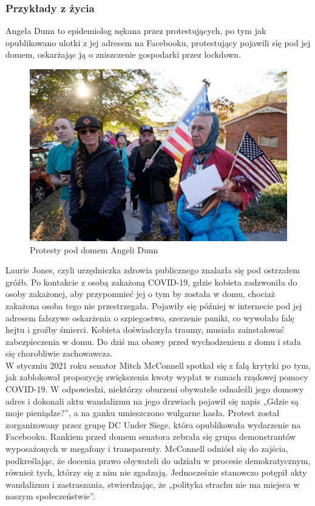 \subsubsection{Przykłady z życia}
Angela Dunn to epidemiolog nękana przez protestujących, po tym jak opublikowano ulotki z jej adresem na Facebooku, protestujący pojawili się pod jej domem, oskarżając ją o zniszczenie gospodarki przez lockdown. 

\begin{figure}
  \centering
  \includegraphics[width=1\textwidth]{images/lockdown.jpg}
  \caption{Protesty pod domem Angeli Dunn}
  \label{fig:lockdown}
\end{figure} 

Laurie Jones, czyli  urzędniczka zdrowia publicznego znalazła się pod ostrzałem gróźb. Po kontakcie z osobą zakażoną COVID-19, gdzie kobieta zadzwoniła do osoby zakażonej, aby przypomnieć jej o tym by została w domu, chociaż zakażona osoba tego nie przestrzegała. Pojawiły się później w internecie pod jej adresem fałszywe oskarżenia o szpiegostwo, szerzenie paniki, co wywołało falę hejtu i groźby śmierci.
Kobieta doświadczyła traumy, musiała zainstalować zabezpieczenia w domu. Do dziś ma obawy przed wychodzeniem z domu i stała się chorobliwie zachowawcza.\\

W styczniu 2021 roku senator Mitch McConnell spotkał się z falą krytyki po tym, jak zablokował propozycję zwiększenia kwoty wypłat w ramach rządowej pomocy COVID-19. W odpowiedzi, niektórzy oburzeni obywatele odnaleźli jego domowy adres i dokonali aktu wandalizmu na jego drzwiach pojawił się napis „Gdzie są moje pieniądze?”, a na ganku umieszczono wulgarne hasła.
Protest został zorganizowany przez grupę DC Under Siege, która opublikowała wydarzenie na Facebooku. Rankiem przed domem senatora zebrała się grupa demonstrantów wyposażonych w megafony i transparenty.
McConnell odniósł się do zajścia, podkreślając, że docenia prawo obywateli do udziału w procesie demokratycznym, również tych, którzy się z nim nie zgadzają. Jednocześnie stanowczo potępił akty wandalizmu i zastraszania, stwierdzając, że „polityka strachu nie ma miejsca w naszym społeczeństwie”.

